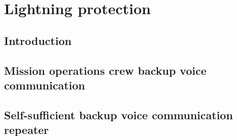 \chapter{Lightning protection}

\section{Introduction}
\section{Mission operations crew backup voice communication}
\section{Self-sufficient backup voice communication repeater}